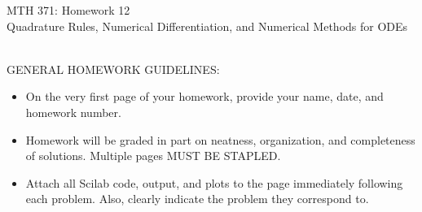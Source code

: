 \documentclass[addpoints, 11pt]{exam}
\begin{document}
\vspace{100mm}
\begin{center} \Large
MTH 371: Homework 12 \\ Quadrature Rules, Numerical Differentiation, and Numerical Methods for ODEs\normalsize
\end{center}
\ \\
\noindent GENERAL HOMEWORK GUIDELINES: 
\begin{itemize}
\item On the very first page of your homework, provide your name, date, and homework number.\vspace{-2mm}
\item Homework will be graded in part on neatness, organization, and completeness of solutions. Multiple pages MUST BE STAPLED. \vspace{-2mm}
\item Attach all Scilab code, output, and plots to the page immediately following each problem. Also, clearly indicate the problem they correspond to.
\end{itemize}
\end{document}
